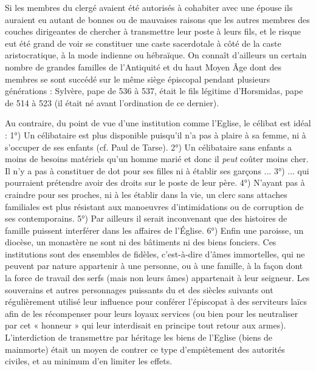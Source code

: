   Si les membres du clergé avaient été autorisés à cohabiter avec une épouse ils auraient eu autant de bonnes ou de mauvaises raisons que les autres membres des couches dirigeantes de chercher à transmettre leur poste à leurs fils,  et le risque eut été grand de voir se constituer une caste sacerdotale à côté de la caste aristocratique, à la mode indienne ou hébraïque. On connaît d'ailleurs un certain nombre de grandes familles de l'Antiquité et du haut Moyen Âge dont des membres se sont succédé sur le même siège épiscopal pendant plusieurs générations : Sylvère, pape de 536 à 537, était le fils légitime d'Horsmidas, pape de 514 à 523 (il était né avant l'ordination de ce dernier). 

 Au contraire, du point de vue d'une institution comme l'Eglise, le célibat est idéal : 1°) Un célibataire est plus disponible puisqu'il n'a pas à plaire à sa femme, ni à s'occuper de ses enfants (cf. Paul de Tarse). 2°) Un célibataire sans enfants a moins de besoins matériels qu'un homme marié et donc il \emph{peut} coûter moins cher. Il n'y a pas à constituer de dot pour ses filles ni à établir ses garçons ... 3°) ... qui pourraient prétendre avoir des droits sur le poste de leur père. 4°) N'ayant pas à craindre pour ses proches, ni à les établir dans la vie, un clerc sans attaches familiales est plus résistant aux manoeuvres d'intimidations ou de corruption de ses contemporains. 5°) Par ailleurs il serait inconvenant que des histoires de famille puissent interférer dans les affaires de l'Église. 6°) Enfin une paroisse, un diocèse, un monastère ne sont ni des bâtiments ni des biens fonciers. Ces institutions sont des ensembles de fidèles, c'est-à-dire d'âmes immortelles, qui ne peuvent par nature appartenir à une personne, ou à une famille, à la façon dont la force de travail des serfs (mais non leurs âmes) appartenait à leur seigneur. Les souverains et autres personnages puissants du  et des siècles suivants ont régulièrement utilisé leur influence pour conférer l'épiscopat à des serviteurs laïcs afin de les récompenser pour leurs loyaux services (ou bien pour les neutraliser par cet « honneur » qui leur interdisait en principe tout retour aux armes). L'interdiction de transmettre par héritage les biens de l'Eglise (biens de mainmorte) était un moyen de contrer ce type d'empiètement des autorités civiles, et au minimum d'en limiter les effets.

